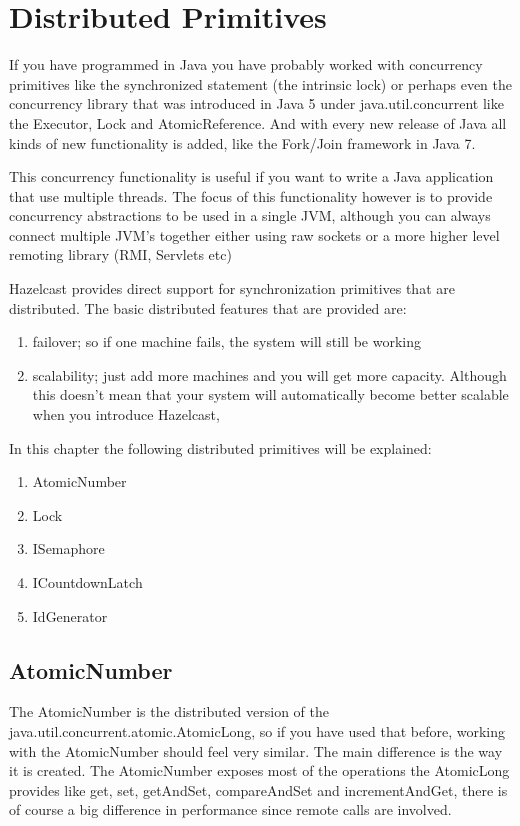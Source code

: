 \chapter{Distributed Primitives}

If you have programmed in Java you have probably worked with concurrency primitives like the synchronized statement (the intrinsic lock) or perhaps even the concurrency library that was introduced in Java 5 under java.util.concurrent like the Executor, Lock and AtomicReference. And with every new release of Java all kinds of new functionality is added, like the Fork/Join framework in Java 7.

This concurrency functionality is useful if you want to write a Java application that use multiple threads. The focus of this functionality however is to provide concurrency abstractions to be used in a single JVM, although you can always connect multiple JVM's together either using raw sockets or a more higher level remoting library (RMI, Servlets etc)

Hazelcast provides direct support for synchronization primitives that are distributed. The basic distributed features that are provided are:
\begin{enumerate}
\item failover; so if one machine fails, the system will still be working
\item scalability; just add more machines and you will get more capacity. Although this doesn't mean that your system will automatically become better scalable when you introduce Hazelcast, 
\end{enumerate}
In this chapter the following distributed primitives will be explained:
\begin{enumerate}
\item AtomicNumber
\item Lock
\item ISemaphore
\item ICountdownLatch
\item IdGenerator
\end{enumerate}
\section{AtomicNumber}
The AtomicNumber is the distributed version of the java.util.concurrent.atomic.AtomicLong, so if you have used that before, working with the AtomicNumber should feel very similar. The main difference is the way it is created. The AtomicNumber exposes most of the operations the AtomicLong provides like get, set, getAndSet, compareAndSet and incrementAndGet, there is of course a big difference in performance since remote calls are involved.

